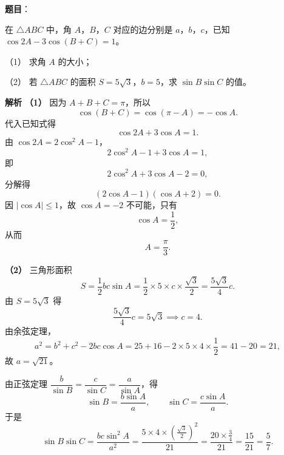 \begin{answer}

\textbf{题目}：

在 $\triangle ABC$ 中，角 $A$，$B$，$C$ 对应的边分别是 $a$，$b$，$c$，已知 $\cos2A-3\cos(B+C)=1$。

（1） 求角 $A$ 的大小；

（2） 若 $\triangle ABC$ 的面积 $S=5\sqrt3$，$b=5$，求 $\sin B\sin C$ 的值。

\textbf{解析}
\textbf{（1）} 因为 $A+B+C=\pi$，所以
\nopagebreak[4]
\[\cos(B+C)=\cos(\pi-A)=-\cos A.\]
代入已知式得
\nopagebreak[4]
\[\cos2A+3\cos A=1.\]
由 $\cos2A=2\cos^2A-1$，
\nopagebreak[4]
\[2\cos^2A-1+3\cos A=1,\]
即
\nopagebreak[4]
\[2\cos^2A+3\cos A-2=0,\]
分解得
\nopagebreak[4]
\[(2\cos A-1)(\cos A+2)=0.\]
因 $|\cos A|\leqslant1$，故 $\cos A=-2$ 不可能，只有
\nopagebreak[4]
\[\cos A=\frac12,\]
从而
\nopagebreak[4]
\[A=\frac\pi3.\]

\textbf{（2）} 三角形面积
\nopagebreak[4]
\[S=\frac12bc\sin A=\frac12\times5\times c\times\frac{\sqrt3}2=\frac{5\sqrt3}{4}c.\]
由 $S=5\sqrt3$ 得
\nopagebreak[4]
\[\frac{5\sqrt3}{4}c=5\sqrt3\implies c=4.\]
由余弦定理，
\nopagebreak[4]
\[a^2=b^2+c^2-2bc\cos A=25+16-2\times5\times4\times\frac12=41-20=21,\]
故 $a=\sqrt{21}$。

由正弦定理 $\dfrac b{\sin B}=\dfrac c{\sin C}=\dfrac a{\sin A}$，得
\nopagebreak[4]
\[\sin B=\frac{b\sin A}{a},\qquad \sin C=\frac{c\sin A}{a}.\]
于是
\nopagebreak[4]
\[\sin B\sin C=\frac{bc\sin^2A}{a^2}
=\frac{5\times4\times\left(\frac{\sqrt3}2\right)^2}{21}
=\frac{20\times\frac34}{21}
=\frac{15}{21}=\frac57.\]



\end{answer}
